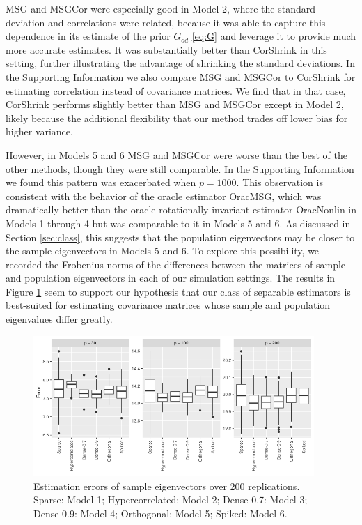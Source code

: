 \documentclass[useAMS,referee,usenatbib]{biom}
\begin{document}
MSG and MSGCor were especially good in Model 2, where the standard deviation and correlations were related, because it was able to capture this dependence in its estimate of the prior $G_{od}$ \eqref{eq:G} and leverage it to provide much more accurate estimates. It was substantially better than CorShrink in this setting, further illustrating the advantage of shrinking the standard deviations. In the Supporting Information we also compare MSG and MSGCor to CorShrink for estimating correlation instead of covariance matrices. We find that in that case, CorShrink performs slightly better than MSG and MSGCor except in Model 2, likely because the additional flexibility that our method trades off lower bias for higher variance.

However, in Models 5 and 6 MSG and MSGCor were worse than the best of the other methods, though they were still comparable. In the Supporting Information we found this pattern was exacerbated when $p = 1000$. This observation is consistent with the behavior of the oracle estimator OracMSG, which was dramatically better than the oracle rotationally-invariant estimator OracNonlin in Models 1 through 4 but was comparable to it in Models 5 and 6. As discussed in Section \ref{sec:class}, this suggests that the population eigenvectors may be closer to the sample eigenvectors in Models 5 and 6. To explore this possibility, we recorded the Frobenius norms of the differences between the matrices of sample and population eigenvectors in each of our simulation settings. The results in Figure \ref{fig:eigenvectors} seem to support our hypothesis that our class of separable estimators is best-suited for estimating covariance matrices whose sample and population eigenvalues differ greatly.

\begin{figure}
\begin{center}
\centerline{  \includegraphics[width=0.95\textwidth]{img/eigenvectors.png}}
\end{center}
\caption{Estimation errors of sample eigenvectors over 200 replications. Sparse: Model 1; Hypercorrelated: Model 2; Dense-0.7: Model 3; Dense-0.9: Model 4; Orthogonal: Model 5; Spiked: Model 6.}
\label{fig:eigenvectors}
\end{figure}
\end{document}
